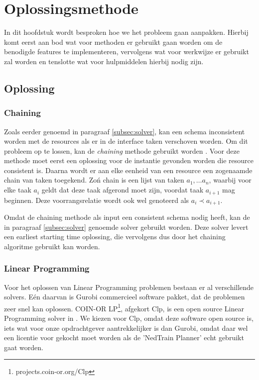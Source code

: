 \section{Oplossingsmethode}
In dit hoofdstuk wordt besproken hoe we het probleem gaan aanpakken. Hierbij komt eerst aan bod wat voor methoden er gebruikt gaan worden om de benodigde features te implementeren, vervolgens wat voor werkwijze er gebruikt zal worden en tenslotte wat voor hulpmiddelen hierbij nodig zijn.

\subsection{Oplossing}


\subsubsection*{Chaining}
Zoals eerder genoemd in paragraaf \ref{subsec:solver}, kan een schema inconsistent worden met de resources als er in de interface taken verschoven worden. Om dit probleem op te lossen, kan de \emph{chaining} methode gebruikt worden \cite{policella2007precedence}. Voor deze methode moet eerst een oplossing voor de instantie gevonden worden die resource consistent is. Daarna wordt er aan elke eenheid van een resource een zogenaamde chain van taken toegekend. Zo\'n chain is een lijst van taken $a_1, \dots a_n$, waarbij voor elke taak $a_i$ geldt dat deze taak afgerond moet zijn, voordat taak $a_{i+1}$ mag beginnen. Deze voorrangsrelatie wordt ook wel genoteerd als $a_i \prec a_{i+1}$.

Omdat de chaining methode als input een consistent schema nodig heeft, kan de in paragraaf \ref{subsec:solver} genoemde solver gebruikt worden. Deze solver levert een earliest starting time oplossing, die vervolgens dus door het chaining algoritme gebruikt kan worden.


\subsubsection*{Linear Programming}
Voor het oplossen van Linear Programming problemen bestaan er al verschillende solvers. E\'en daarvan is Gurobi commercieel software pakket, dat de problemen zeer snel kan oplossen. COIN-OR LP\footnote{projects.coin-or.org/Clp}, afgekort Clp, is een open source Linear Programming solver in \cpp . We kiezen voor Clp, omdat deze software open source is, iets wat voor onze opdrachtgever aantrekkelijker is dan Gurobi, omdat daar wel een licentie voor gekocht moet worden als de 'NedTrain Planner' echt gebruikt gaat worden.

